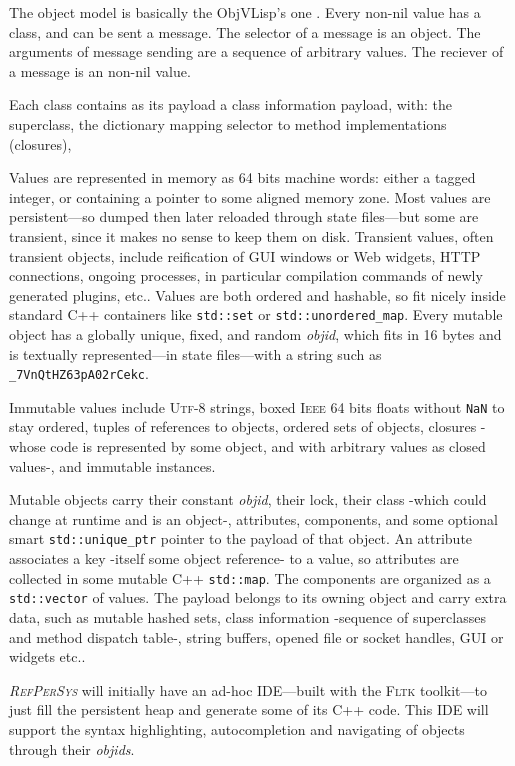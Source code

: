 \documentclass{IEEEtran}
\newcommand{\RefPerSys}{{\textit{\textsc{RefPerSys}}}}
\begin{document}
The object model is basically the ObjVLisp's one
\cite{cointe:1987:metaclasses}. Every non-nil value has a class, and
can be sent a message. The selector of a message is an object. The
arguments of message sending are a sequence of arbitrary values. The
reciever of a message is an non-nil value.

Each class contains as its payload a class information payload, with: the superclass, the dictionary mapping selector to method implementations (closures), 
\medskip


Values are represented in memory as
64 bits machine words: either a tagged integer, or containing a
pointer to some aligned memory zone. Most values are persistent---so
dumped then later reloaded through state files---but some are transient,
since it makes no sense to keep them on disk. Transient values, often
transient objects, include reification of GUI windows or Web widgets,
HTTP connections, ongoing processes, in particular compilation
commands of newly generated plugins, etc.. Values are both ordered
and hashable, so fit nicely inside standard C++ containers like
\texttt{std::set} or \texttt{std::unordered\_map}. Every mutable
object has a globally unique, fixed, and random \emph{objid}, which
fits in 16 bytes and is textually represented---in state files---with a
string such as \texttt{\_7VnQtHZ63pA02rCekc}.

Immutable values include \textsc{Utf-8} strings, boxed \textsc{Ieee}
64 bits floats without \texttt{NaN} to stay ordered, tuples of
references to objects, ordered sets of objects, closures -whose code
is represented by some object, and with arbitrary values as closed
values-, and immutable instances.

Mutable objects carry their constant \emph{objid}, their lock, their
class -which could change at runtime and is an object-, attributes,
components, and some optional smart \texttt{std::unique\_ptr} pointer
to the payload of that object. An attribute associates a key -itself
some object reference- to a value, so attributes are collected in some
mutable C++ \texttt{std::map}. The components are organized as a
\texttt{std::vector} of values. The payload belongs to its owning
object and carry extra data, such as mutable hashed sets, class
information -sequence of superclasses and method dispatch table-,
string buffers, opened file or socket handles, GUI or widgets etc..

{\RefPerSys} will initially have an ad-hoc IDE---built with the \textsc{Fltk}
toolkit---to just fill the persistent heap and generate some of its C++
code. This IDE will support the syntax highlighting, autocompletion and
navigating of objects through their \emph{objids}.
\end{document}
